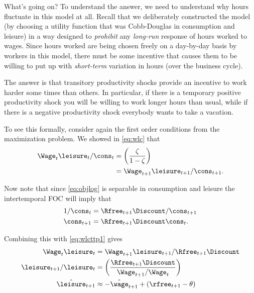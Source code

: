 What's going on?  To understand the answer, we need to understand why
hours fluctuate in this model at all.  Recall that we deliberately constructed the
model (by choosing a utility function that was Cobb-Douglas in consumption and
leisure) in a way designed to {\it prohibit} any {\it long-run} response of hours
worked to wages.  Since hours worked are being chosen freely on a
day-by-day basis by workers in this model, there must be some
incentive that causes them to be willing to put up with {\it short-term}
variation in hours (over the business cycle).

The answer is that transitory productivity shocks provide an incentive
to work harder some times than others.  In particular, if there is a
temporary positive productivity shock you will be willing to work longer hours
than usual, while if there is a negative productivity shock everybody
wants to take a vacation.  

To see this formally, consider again the first order conditions from
the maximization problem.  We showed in \eqref{eq:wlc} that 
\begin{equation}\begin{gathered}\begin{aligned}
        \Wage_{t}\leisure_{t}/\cons_{t} & =  \left(\frac{\zeta}{1-\zeta}\right)  \\
         & =  \Wage_{t+1}\leisure_{t+1}/\cons_{t+1}.  \label{eq:wlcttp1}
\end{aligned}\end{gathered}\end{equation}

Now note that since \eqref{eq:objlog} is separable in consumption
and leisure the intertemporal FOC will imply that
\begin{equation}\begin{gathered}\begin{aligned}
        1/\cons_{t}   & =  \Rfree_{t+1}\Discount /\cons_{t+1}
\\  \cons_{t+1}   & =  \Rfree_{t+1}\Discount \cons_{t}.
\end{aligned}\end{gathered}\end{equation}

Combining this with \eqref{eq:wlcttp1} gives
\begin{equation}\begin{gathered}\begin{aligned}
        \Wage_{t}\leisure_{t} & =  \Wage_{t+1}\leisure_{t+1}/\Rfree_{t+1}\Discount  \\
        \leisure_{t+1}/\leisure_{t} & =  \left(\frac{\Rfree_{t+1}\Discount}{\Wage_{t+1}/\Wage_{t}}\right)  \\
        \hat{\leisure }_{t+1} & \approx  -\hat{\wage }_{t+1}+(\rfree_{t+1}-\theta)
\end{aligned}\end{gathered}\end{equation}


